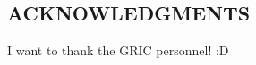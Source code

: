 


\vspace*{2in}
\begin{center}
\emph{\blindtext} %
\end{center}

\newpage


\vspace*{0.5in}
\begin{center}
\section*{ACKNOWLEDGMENTS}
\end{center}


\noindent I want to thank the GRIC personnel! :D
\newline
\noindent
\blindtext %



